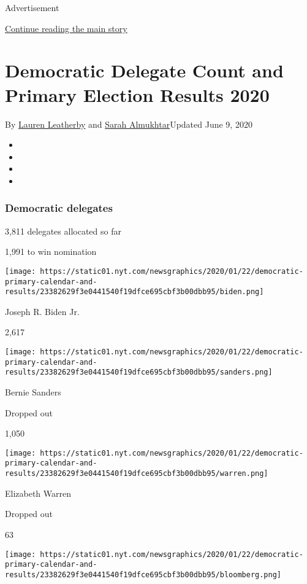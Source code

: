 Advertisement

\protect\hyperlink{after-top}{Continue reading the main story}

\hypertarget{democratic-delegate-count-and-primary-election-results-2020}{%
\section{Democratic Delegate Count and Primary Election Results
2020}\label{democratic-delegate-count-and-primary-election-results-2020}}

By \href{https://www.nytimes.com/by/lauren-leatherby}{Lauren Leatherby}
and \href{https://www.nytimes.com/by/sarah-almukhtar}{Sarah
Almukhtar}Updated June 9, 2020

\begin{itemize}
\item
\item
\item
\item
\end{itemize}

\hypertarget{democratic-delegates}{%
\subsubsection{Democratic delegates}\label{democratic-delegates}}

3,811 delegates allocated so far

1,991 to win nomination

\texttt{[image: https://static01.nyt.com/newsgraphics/2020/01/22/democratic-primary-calendar-and-results/23382629f3e0441540f19dfce695cbf3b00dbb95/biden.png]}

Joseph R. Biden Jr.

2,617

\texttt{[image: https://static01.nyt.com/newsgraphics/2020/01/22/democratic-primary-calendar-and-results/23382629f3e0441540f19dfce695cbf3b00dbb95/sanders.png]}

Bernie Sanders

Dropped out

1,050

\texttt{[image: https://static01.nyt.com/newsgraphics/2020/01/22/democratic-primary-calendar-and-results/23382629f3e0441540f19dfce695cbf3b00dbb95/warren.png]}

Elizabeth Warren

Dropped out

63

\texttt{[image: https://static01.nyt.com/newsgraphics/2020/01/22/democratic-primary-calendar-and-results/23382629f3e0441540f19dfce695cbf3b00dbb95/bloomberg.png]}

